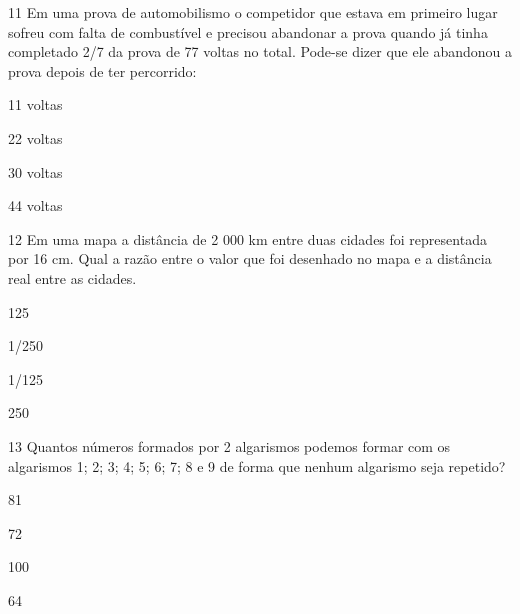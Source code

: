 {

\num{11} Em uma prova de automobilismo o competidor que estava em primeiro
lugar sofreu com falta de combustível e precisou abandonar a prova
quando já tinha completado 2/7 da prova de 77 voltas no total. Pode-se
dizer que ele abandonou a prova depois de ter percorrido:

\begin{escolha}
\item
  11 voltas
\item
  22 voltas
\item
  30 voltas
\item
  44 voltas
\end{escolha}


\num{12} Em uma mapa a distância de 2 000 km entre duas cidades foi
representada por 16 cm. Qual a razão entre o valor que foi desenhado no
mapa e a distância real entre as cidades.

\begin{escolha}
\item
  125
\item
  1/250
\item
  1/125
\item
  250
\end{escolha}


\num{13} Quantos números formados por 2 algarismos podemos formar com os
algarismos 1; 2; 3; 4; 5; 6; 7; 8 e 9 de forma que nenhum algarismo seja
repetido?

\begin{escolha}
\item
  81
\item
  72
\item
  100
\item
  64
\end{escolha}

}
